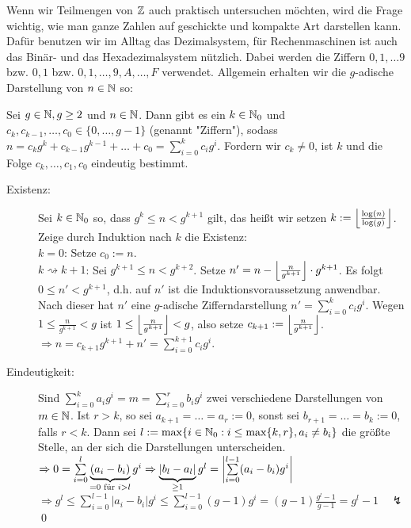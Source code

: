 Wenn wir Teilmengen von $\ZZ$ auch praktisch untersuchen möchten, wird die Frage wichtig, wie man ganze Zahlen auf geschickte und kompakte Art darstellen kann. 
Dafür benutzen wir im Alltag das Dezimalsystem, für Rechenmaschinen ist auch das Binär- und das Hexadezimalsystem nützlich. 
Dabei werden die Ziffern $0,1,\dots 9$ bzw. $0,1$ bzw. $0,1,\dots, 9, A, \dots, F$ verwendet. 
Allgemein erhalten wir die $g$-adische Darstellung von $n \in \NN$ so:

\begin{satz}
\label{satz_g-adisch}
	Sei $g \in \NN, g \geq 2$ und $n \in \NN$. 
	Dann gibt es ein $k \in \NN_0$ und $c_k, c_{k-1}, \dots, c_0 \in \{0, \dots, g-1\}$ (genannt "Ziffern"), sodass $n = c_k g^k + c_{k-1} g^{k-1} + \dots + c_0 = \sum_{i=0}^k c_i g^i$. 
	Fordern wir $c_k \neq 0$, ist $k$ und die Folge $c_k, \dots, c_1, c_0$ eindeutig bestimmt.
\end{satz}

	\begin{description}
	\item[Existenz:] Sei $k \in \NN_0$ so, dass $g^k \leq n < g^{k+1}$ gilt, das heißt wir setzen $k := \floor*{\frac{\log(n)}{\log(g)}}$. 
	Zeige durch Induktion nach $k$ die Existenz: \\
	$k = 0$: Setze $c_0 := n$. \\
	$k \rightsquigarrow k+1$: Sei $g^{k+1} \leq n < g^{k+2}$. 
	Setze $n' = n - \floor*{\frac{n}{g^{k+1}}} \cdot g^{k+1}$. 
	Es folgt $0 \leq n' < g^{k+1}$, d.h. auf $n'$ ist die Induktionsvoraussetzung anwendbar. 
	Nach dieser hat $n'$ eine $g$-adische Zifferndarstellung $n' = \sum\limits_{i=0}^{k} c_i g^i$. 
	Wegen $1 \leq  \frac{n}{g^{k+1}} < g$ ist $1 \leq \floor*{\frac{n}{g^{k+1}}} < g$, also setze $c_{k+1} := \floor*{\frac{n}{g^{k+1}}}$. \\
	$\Rightarrow  n = c_{k+1} g^{k+1} + n' = \sum\limits_{i=0}^{k+1} c_i g^i$.
	\item[Eindeutigkeit:] Sind $\sum\limits_{i=0}^{k} a_i g^i = m = \sum\limits_{i=0}^{r} b_i g^i$ zwei verschiedene Darstellungen von $m \in \NN$. 
	Ist $r > k$, so sei $a_{k+1} = \dots = a_r := 0$, sonst sei $b_{r+1} = \dots = b_k := 0$, falls $r < k$. 
	Dann sei $l := \max \{i \in \NN_0 : \linebreak i \leq \max\{k,r\}, a_i \neq b_i \}$ die größte Stelle, an der sich die Darstellungen unterscheiden. \\
	$\Rightarrow 0 = \sum\limits_{i=0}^l \underbrace{(a_i-b_i)}_{=0 \text{ für } i>l} g^i \Rightarrow \underbrace{|b_l - a_l|}_{\geq 1} g^l = \abs*{\sum\limits_{i=0}^{l-1} (a_i - b_i)g^i}$ \\
	$\Rightarrow g^l \leq \sum\limits_{i=0}^{l-1} |a_i-b_i| g^i \leq \sum\limits_{i=0}^{l-1} (g-1) g^i = (g-1) \frac{g^l - 1}{g-1} = g^l - 1 \quad \lightning$ \qed
	\end{description}


